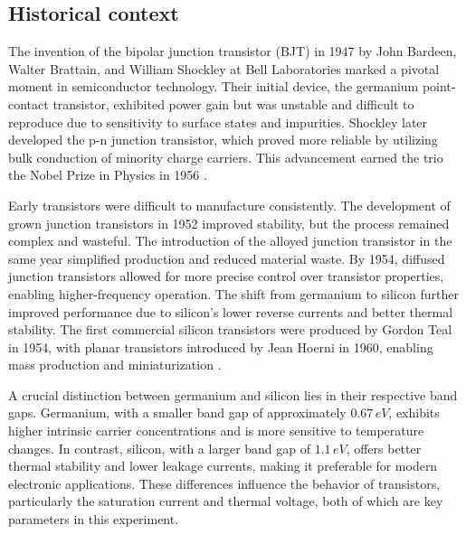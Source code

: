 \documentclass[12pt,letterpaper,twocolumn]{article}
\begin{document}
\subsection{Historical context}


The invention of the bipolar junction transistor (BJT) in 1947 by John Bardeen, Walter Brattain, and William Shockley at Bell Laboratories marked a pivotal moment in semiconductor technology. Their initial device, the germanium point-contact transistor, exhibited power gain but was unstable and difficult to reproduce due to sensitivity to surface states and impurities. Shockley later developed the p-n junction transistor, which proved more reliable by utilizing bulk conduction of minority charge carriers. This advancement earned the trio the Nobel Prize in Physics in 1956 \cite{Lukasiak}.

Early transistors were difficult to manufacture consistently. The development of grown junction transistors in 1952 improved stability, but the process remained complex and wasteful. The introduction of the alloyed junction transistor in the same year simplified production and reduced material waste. By 1954, diffused junction transistors allowed for more precise control over transistor properties, enabling higher-frequency operation. The shift from germanium to silicon further improved performance due to silicon's lower reverse currents and better thermal stability. The first commercial silicon transistors were produced by Gordon Teal in 1954, with planar transistors introduced by Jean Hoerni in 1960, enabling mass production and miniaturization \cite{Lukasiak}.

A crucial distinction between germanium and silicon lies in their respective band gaps. Germanium, with a smaller band gap of approximately \(0.67\,eV\), exhibits higher intrinsic carrier concentrations and is more sensitive to temperature changes. In contrast, silicon, with a larger band gap of \(1.1\,eV\), offers better thermal stability and lower leakage currents, making it preferable for modern electronic applications. These differences influence the behavior of transistors, particularly the saturation current and thermal voltage, both of which are key parameters in this experiment\cite{Collings}.
\end{document}
